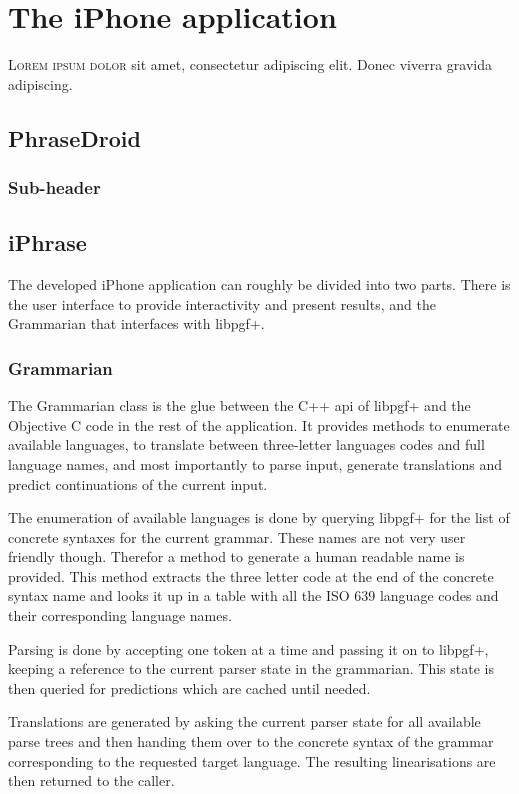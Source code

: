 \chapter{The iPhone application}
\lettrine[lines=4, loversize=-0.1, lraise=0.1]{L}{orem ipsum dolor} sit amet, consectetur adipiscing elit. Donec viverra gravida adipiscing.

\section{PhraseDroid}
\subsection{Sub-header}

\section{iPhrase}
The developed iPhone application can roughly be divided into two parts. There is the user interface to provide interactivity and present results, and the Grammarian that interfaces with libpgf+.

\subsection{Grammarian}
\label{sec:grammarian}
The Grammarian class is the glue between the C++ api of libpgf+ and the Objective C code in the rest of the application. It provides methods to enumerate available languages, to translate between three-letter languages codes and full language names, and most importantly to parse input, generate translations and predict continuations of the current input.

The enumeration of available languages is done by querying libpgf+ for the list of concrete syntaxes for the current grammar. These names are not very user friendly though. Therefor a method to generate a human readable name is provided. This method extracts the three letter code at the end of the concrete syntax name and looks it up in a table with all the ISO 639 language codes and their corresponding language names.

Parsing is done by accepting one token at a time and passing it on to libpgf+, keeping a reference to the current parser state in the grammarian. This state is then queried for predictions which are cached until needed.

Translations are generated by asking the current parser state for all available parse trees and then handing them over to the concrete syntax of the grammar corresponding to the requested target language. The resulting linearisations are then returned to the caller.

